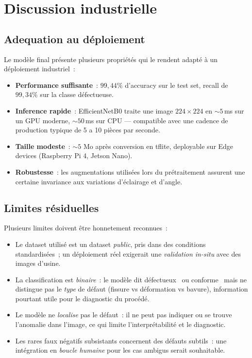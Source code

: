\documentclass[12pt,a4paper,openany]{report}
\begin{document}
\section{Discussion industrielle}

\subsection{Adequation au déploiement}

Le modèle final présente plusieurs propriétés qui le rendent adapté à un déploiement industriel~:
\begin{itemize}
    \item \textbf{Performance suffisante}~: $99{,}44\%$ d'accuracy sur le test set, recall de $99{,}34\%$ sur la classe défectueuse.
    \item \textbf{Inference rapide}~: EfficientNetB0 traite une image $224\times224$ en $\sim 5$\,ms sur un GPU moderne, $\sim 50$\,ms sur CPU --- compatible avec une cadence de production typique de 5 a 10 pièces par seconde.
    \item \textbf{Taille modeste}~: $\sim 5$ Mo après conversion en \gls{tflite}, deployable sur Edge devices (Raspberry Pi 4, Jetson Nano).
    \item \textbf{Robustesse}~: les augmentations utilisées lors du prétraitement assurent une certaine invariance aux variations d'éclairage et d'angle.
\end{itemize}

\subsection{Limites résiduelles}

Plusieurs limites doivent être honnetement reconnues~:
\begin{itemize}
    \item Le dataset utilisé est un dataset \emph{public}, pris dans des conditions standardisées~; un déploiement réel exigerait une \emph{validation in-situ} avec des images d'usine.
    \item La classification est \emph{binaire}~: le modèle dit \og défectueux \fg\ ou \og conforme \fg\ mais ne distingue pas le \emph{type} de défaut (fissure vs déformation vs bavure), information pourtant utile pour le diagnostic du procédé.
    \item Le modèle ne \emph{localise} pas le défaut~: il ne peut pas indiquer ou se trouve l'anomalie dans l'image, ce qui limite l'interprétabilité et le diagnostic.
    \item Les rares faux négatifs subsistants concernent des défauts subtils~: une intégration en \emph{boucle humaine} pour les cas ambigus serait souhaitable.
\end{itemize}
\end{document}
